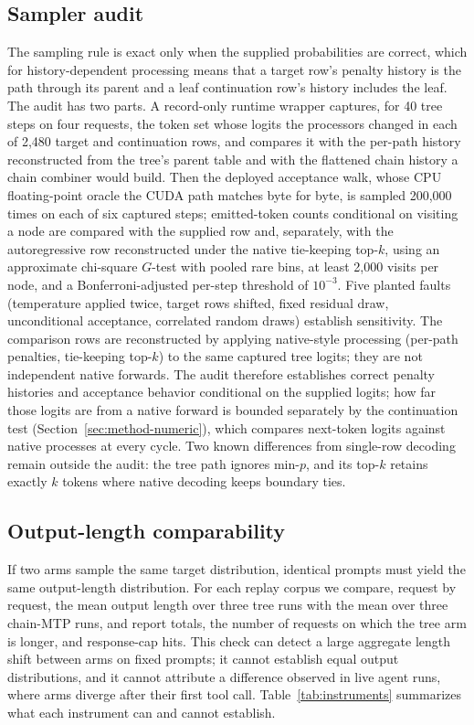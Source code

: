 \documentclass[sigconf,anonymous,review]{acmart}
\begin{document}
\subsection{Sampler audit}
\label{sec:method-sampler}
The sampling rule is exact only when the supplied probabilities are correct, which for history-dependent processing means that a target row's penalty history is the path through its parent and a leaf continuation row's history includes the leaf. The audit has two parts. A record-only runtime wrapper captures, for 40 tree steps on four requests, the token set whose logits the processors changed in each of 2,480 target and continuation rows, and compares it with the per-path history reconstructed from the tree's parent table and with the flattened chain history a chain combiner would build. Then the deployed acceptance walk, whose CPU floating-point oracle the CUDA path matches byte for byte, is sampled 200,000 times on each of six captured steps; emitted-token counts conditional on visiting a node are compared with the supplied row and, separately, with the autoregressive row reconstructed under the native tie-keeping top-$k$, using an approximate chi-square $G$-test with pooled rare bins, at least 2,000 visits per node, and a Bonferroni-adjusted per-step threshold of $10^{-3}$. Five planted faults (temperature applied twice, target rows shifted, fixed residual draw, unconditional acceptance, correlated random draws) establish sensitivity. The comparison rows are reconstructed by applying native-style processing (per-path penalties, tie-keeping top-$k$) to the same captured tree logits; they are not independent native forwards. The audit therefore establishes correct penalty histories and acceptance behavior conditional on the supplied logits; how far those logits are from a native forward is bounded separately by the continuation test (Section~\ref{sec:method-numeric}), which compares next-token logits against native processes at every cycle. Two known differences from single-row decoding remain outside the audit: the tree path ignores min-$p$, and its top-$k$ retains exactly $k$ tokens where native decoding keeps boundary ties.

\subsection{Output-length comparability}
\label{sec:method-length}
If two arms sample the same target distribution, identical prompts must yield the same output-length distribution. For each replay corpus we compare, request by request, the mean output length over three tree runs with the mean over three chain-MTP runs, and report totals, the number of requests on which the tree arm is longer, and response-cap hits. This check can detect a large aggregate length shift between arms on fixed prompts; it cannot establish equal output distributions, and it cannot attribute a difference observed in live agent runs, where arms diverge after their first tool call. Table~\ref{tab:instruments} summarizes what each instrument can and cannot establish.
\end{document}
